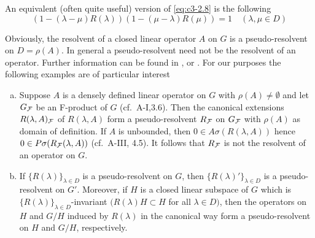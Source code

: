 An equivalent (often quite useful) version of \eqref{eq:c3-2.8} is the following
\begin{equation}\label{eq:c3-2.9}
	(1 - (\lambda - \mu)R(\lambda))(1 - (\mu - \lambda)R(\mu)) = 1 \quad (\lambda,\mu \in D)
\end{equation}

Obviously, the resolvent of a closed linear operator $A$ on $G$ is a pseudo-resolvent on $D = \rho(A)$.
In general a pseudo-resolvent need not be the resolvent of an operator.
Further information can be found in \citet{hillephillips:1957}, \citet{pazy:1983} or \citet{yosida:1965}.
For our purposes the following examples are of particular interest

\begin{example}\label{ex:c3-2.5}
	\begin{enumerate}[(a), wide]
		\item 
		Suppose $A$ is a densely defined linear operator on $G$ with $\rho(A) \neq \emptyset$ and let $G_{\mathcal{F}}$ be an F-product of $G$ (cf.\ A-I,3.6).
		Then the canonical extensions $R(\lambda,A)_{\mathcal{F}}$ of $R(\lambda,A)$ form a pseudo-resolvent $R_{\mathcal{F}}$ on $G_{\mathcal{F}}$ with $\rho(A)$ as domain of definition.
		If $A$ is unbounded, then $0 \in A\sigma(R(\lambda,A))$ hence $0 \in P\sigma(R_{\mathcal{F}}(\lambda,A))$ (cf.\ A-III, 4.5).
		It follows that $R_{\mathcal{F}}$ is not the resolvent of an operator on $G$.
		
		\item 
		If $\{R(\lambda)\}_{\lambda\in D}$ is a pseudo-resolvent on $G$, then $\{R(\lambda)'\}_{\lambda\in D}$ is a pseudo-resolvent on $G'$.
		Moreover, if $H$ is a closed linear subspace of $G$ which is $\{R(\lambda)\}_{\lambda\in D}$-invariant $(R(\lambda)H \subset H$ for all $\lambda \in D)$, then the operators on $H$ and $G/H$ induced by $R(\lambda)$ in the canonical way form a pseudo-resolvent on $H$ and $G/H$, respectively.
	\end{enumerate}
\end{example}

